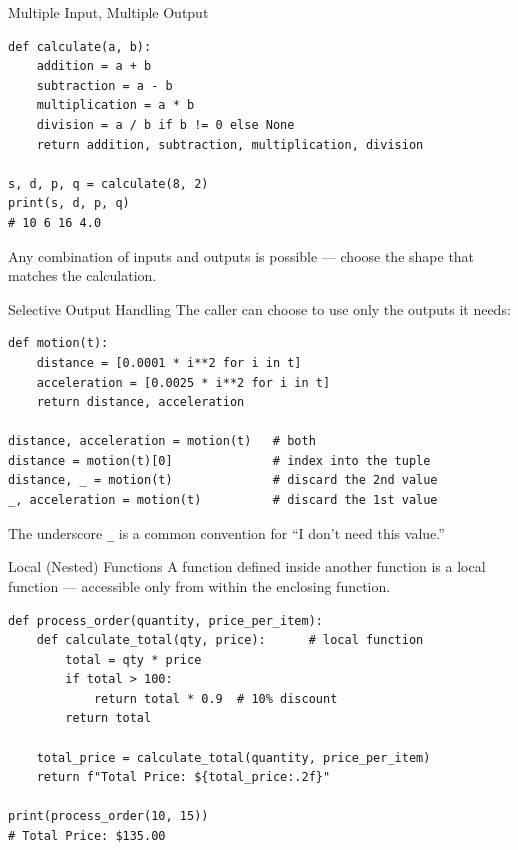 \documentclass[9pt,aspectratio=169,xcolor=table]{beamer}
\begin{document}
\begin{frame}[fragile]{Multiple Input, Multiple Output}
    \leavevmode
\begin{lstlisting}
def calculate(a, b):
    addition = a + b
    subtraction = a - b
    multiplication = a * b
    division = a / b if b != 0 else None
    return addition, subtraction, multiplication, division

s, d, p, q = calculate(8, 2)
print(s, d, p, q)
# 10 6 16 4.0
\end{lstlisting}

    \vspace{1mm}
    {\small Any combination of inputs and outputs is possible --- choose
    the shape that matches the calculation.}
\end{frame}

\begin{frame}[fragile]{Selective Output Handling}
    \leavevmode
    The caller can choose to use only the outputs it needs:

\begin{lstlisting}
def motion(t):
    distance = [0.0001 * i**2 for i in t]
    acceleration = [0.0025 * i**2 for i in t]
    return distance, acceleration

distance, acceleration = motion(t)   # both
distance = motion(t)[0]              # index into the tuple
distance, _ = motion(t)              # discard the 2nd value
_, acceleration = motion(t)          # discard the 1st value
\end{lstlisting}

    \vspace{1mm}
    {\small The underscore \texttt{\_} is a common convention for
    ``I don't need this value.''}
\end{frame}

\begin{frame}[fragile]{Local (Nested) Functions}
    \leavevmode
    A function defined \alert{inside} another function is a local
    function --- accessible only from within the enclosing function.

\begin{lstlisting}
def process_order(quantity, price_per_item):
    def calculate_total(qty, price):      # local function
        total = qty * price
        if total > 100:
            return total * 0.9  # 10% discount
        return total

    total_price = calculate_total(quantity, price_per_item)
    return f"Total Price: ${total_price:.2f}"

print(process_order(10, 15))
# Total Price: $135.00
\end{lstlisting}
\end{frame}
\end{document}
